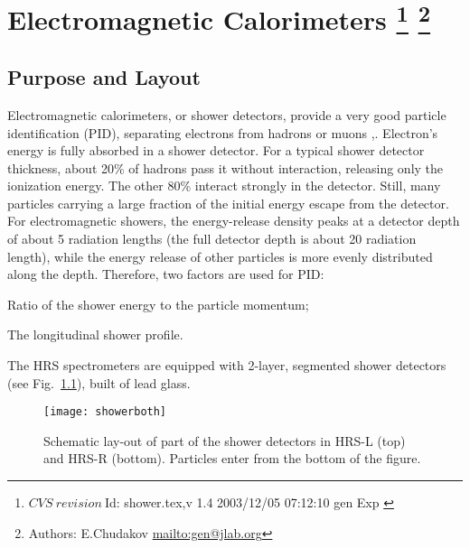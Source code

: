 \chapter[Electromagnetic Calorimeters]{Electromagnetic Calorimeters
\footnote{
  $CVS~revision~ $Id: shower.tex,v 1.4 2003/12/05 07:12:10 gen Exp $ $
}
\footnote{Authors: E.Chudakov \url{mailto:gen@jlab.org}}
}

\section{Purpose and Layout}

Electromagnetic calorimeters, or shower detectors, provide a very good
particle identification (PID), separating electrons from hadrons or
muons \cite{Bartoszek:1991ex},\cite{Appel:1975tt}.  Electron's energy
is fully absorbed in a shower detector.  For a typical shower detector
thickness, about 20\% of hadrons pass it without interaction,
releasing only the ionization energy.  The other 80\% interact
strongly in the detector. Still, many particles carrying a large
fraction of the initial energy escape from the detector. For
electromagnetic showers, the energy-release density peaks at a
detector depth of about 5 radiation lengths (the full detector depth
is about 20 radiation length), while the energy release of other
particles is more evenly distributed along the depth.  Therefore, two
factors are used for PID:
\begin{list}{.~}{\setlength{\itemsep}{-0.15cm}}
  \item Ratio of the shower energy to the particle momentum;
  \item The longitudinal shower profile.
\end{list}

The HRS spectrometers are equipped with 2-layer, segmented shower
detectors (see Fig.~\ref{fig:hrs-det-shower_layout}), built of
lead glass.
\begin{figure}[htb]
\begin{center}
   \texttt{[image: showerboth]}
\end{center}
\caption[Schematic lay-out of part of the shower detectors in HRS]%
{Schematic lay-out of part of the shower detectors in HRS-L
(top) and HRS-R (bottom). Particles enter from the bottom of the figure.}
\label{fig:hrs-det-shower_layout}
\end{figure}
  
